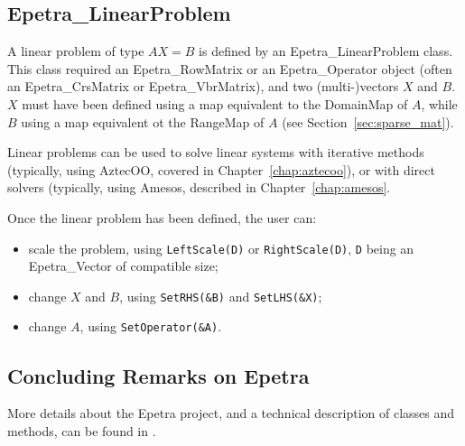 
\subsection{Epetra\_LinearProblem}
\label{sec:linear_problem}

A linear problem of type $A X = B$ is defined by an
Epetra\_LinearProblem class. This class required an Epetra\_RowMatrix or
an Epetra\_Operator object (often an Epetra\_CrsMatrix or
Epetra\_VbrMatrix), and two (multi-)vectors $X$ and $B$. $X$ must have
been defined using a map equivalent to the DomainMap of $A$, while $B$
using a map equivalent ot the RangeMap of $A$ (see
Section~\ref{sec:sparse_mat}).

Linear problems can be used to solve linear systems with iterative
methods (typically, using AztecOO, covered in
Chapter~\ref{chap:aztecoo}), or with direct solvers (typically, using
Amesos, described in Chapter~\ref{chap:amesos}. 

Once the linear problem has been defined, the user can:

\begin{itemize}
\item scale the problem, using \verb!LeftScale(D)! or
  \verb!RightScale(D)!, \verb!D! being an Epetra\_Vector of compatible
  size;
\item change $X$ and $B$, using \verb!SetRHS(&B)! and \verb!SetLHS(&X)!;
\item change $A$, using \verb!SetOperator(&A)!.
\end{itemize}



\subsection{Concluding Remarks on Epetra}
\label{sec:epetra_concluding}

More details about the Epetra project, and a technical description of
classes and methods, can be found in
\cite{Epetra-Ref-Guide,Epetra-Users-Guide}.

